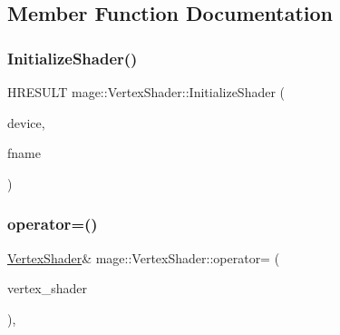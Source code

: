 \subsection{Member Function Documentation}
\hypertarget{classmage_1_1_vertex_shader_adf093a15a55e45ac0a33c7adbdec2af4}{}\label{classmage_1_1_vertex_shader_adf093a15a55e45ac0a33c7adbdec2af4} 
\subsubsection{\texorpdfstring{Initialize\+Shader()}{InitializeShader()}}
{\footnotesize\ttfamily H\+R\+E\+S\+U\+LT mage\+::\+Vertex\+Shader\+::\+Initialize\+Shader (\begin{DoxyParamCaption}\item[{I\+D3\+D11\+Device2 $\ast$}]{device,  }\item[{const wstring \&}]{fname }\end{DoxyParamCaption})\hspace{0.3cm}{\ttfamily [protected]}}

\hypertarget{classmage_1_1_vertex_shader_a0094f5c2adb8377fa5c8d52e7a65136f}{}\label{classmage_1_1_vertex_shader_a0094f5c2adb8377fa5c8d52e7a65136f} 
\subsubsection{\texorpdfstring{operator=()}{operator=()}}
{\footnotesize\ttfamily \hyperlink{classmage_1_1_vertex_shader}{Vertex\+Shader}\& mage\+::\+Vertex\+Shader\+::operator= (\begin{DoxyParamCaption}\item[{const \hyperlink{classmage_1_1_vertex_shader}{Vertex\+Shader} \&}]{vertex\+\_\+shader }\end{DoxyParamCaption})\hspace{0.3cm}{\ttfamily [private]}, {\ttfamily [delete]}}

\hypertarget{classmage_1_1_vertex_shader_a87d31b3f958932d98c624b227d7e9129}{}\label{classmage_1_1_vertex_shader_a87d31b3f958932d98c624b227d7e9129} 
